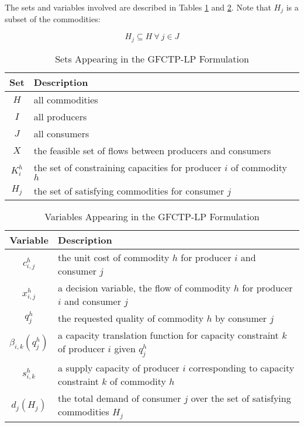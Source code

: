 The sets and variables involved are described in Tables \ref{tbl:GFCTP-LP-sets}
and \ref{tbl:GFCTP-LP-vars}. Note that $H_{j}$ is a subset of the commodities:

\begin{equation}
  H_{j} \subseteq H \: \forall \: j \in J
\end{equation}

\begin{table} [h!]
\centering
\begin{tabularx}{\columnwidth-10pt}{|c|X|} %
\hline
Set         & Description \\
\hline
$H$         & all commodities  \\
$I$         & all producers  \\
$J$         & all consumers  \\
$X$         & the feasible set of flows between producers and consumers  \\
$K_{i}^{h}$  & the set of constraining capacities for 
            producer $i$ of commodity $h$  \\
$H_{j}$     & the set of satisfying commodities for consumer $j$  \\
\hline
\end{tabularx}
\caption{Sets Appearing in the GFCTP-LP Formulation}
\label{tbl:GFCTP-LP-sets}
\end{table}

\begin{table} [h!]
\centering
\begin{tabularx}{\columnwidth-10pt}{|c|X|} %
\hline
Variable    & Description \\
\hline
$c_{i,j}^{h}$             & the unit cost of commodity $h$ 
                          for producer $i$ and consumer $j$  \\
$x_{i,j}^{h}$             & a decision variable, the flow of commodity $h$ 
                          for producer $i$ and consumer $j$  \\
$q_{j}^{h}$               & the requested quality of commodity $h$ 
                          by consumer $j$  \\
$\beta_{i,k}(q_{j}^{h})$  & a capacity translation function for capacity 
                          constraint $k$ of producer $i$ given $q_{j}^{h}$ \\
$s_{i,k}^{h}$             & a supply capacity of producer $i$ corresponding to 
                          capacity constraint $k$ of commodity $h$ \\
$d_{j}(H_{j})$            & the total demand of consumer $j$ over the set of 
                          satisfying commodities $H_{j}$ \\
\hline
\end{tabularx}
\caption{Variables Appearing in the GFCTP-LP Formulation}
\label{tbl:GFCTP-LP-vars}
\end{table}

